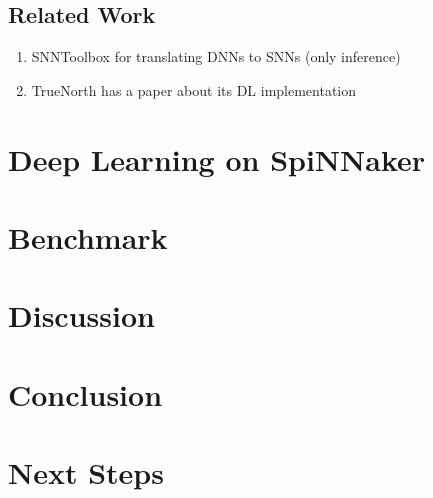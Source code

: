 \documentclass[]{article}
\begin{document}



\subsection{Related Work} %
\label{subsec:related_work}

\begin{enumerate}
  \item SNNToolbox for translating DNNs to SNNs (only inference)
  \item TrueNorth has a paper about its DL implementation
\end{enumerate}



\section{Deep Learning on SpiNNaker}
\label{sec:SpiDNN}

\section{Benchmark}
\label{sec:benchmark}

\section{Discussion}
\label{sec:discussion}

\section{Conclusion}
\label{sec:conclusion}

\section{Next Steps}
\label{sec:next_steps}


\end{document}
